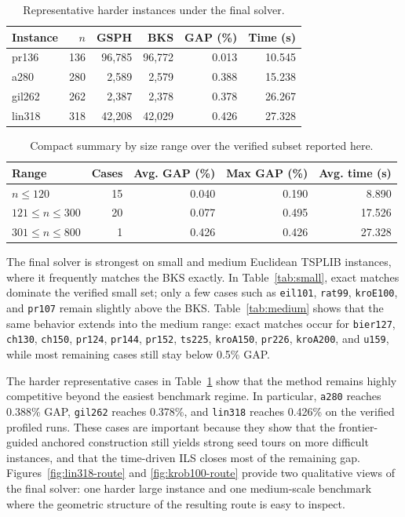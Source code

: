 \documentclass[runningheads]{llncs}
\begin{document}
\begin{table}
\caption{Representative harder instances under the final solver.}
\label{tab:hard}
\centering\small
\begin{tabular}{@{}lrrrrr@{}}
\toprule
\textbf{Instance} & $n$ & \textbf{GSPH} & \textbf{BKS} & \textbf{GAP (\%)} & \textbf{Time (s)}\\
\midrule
pr136   & 136 &  96{,}785 &  96{,}772 & 0.013 & 10.545 \\
 a280    & 280 &   2{,}589 &   2{,}579 & 0.388 & 15.238 \\
 gil262  & 262 &   2{,}387 &   2{,}378 & 0.378 & 26.267 \\
 lin318  & 318 &  42{,}208 &  42{,}029 & 0.426 & 27.328 \\
\bottomrule
\end{tabular}
\end{table}

\begin{table}
\caption{Compact summary by size range over the verified subset reported here.}
\label{tab:summary}
\centering\small
\begin{tabular}{@{}lrrrr@{}}
\toprule
\textbf{Range} & \textbf{Cases} & \textbf{Avg. GAP (\%)} & \textbf{Max GAP (\%)} & \textbf{Avg. time (s)}\\
\midrule
$n\le 120$        & 15 & 0.040 & 0.190 & 8.890 \\
$121\le n\le 300$ & 20 & 0.077 & 0.495 & 17.526 \\
$301\le n\le 800$ &  1 & 0.426 & 0.426 & 27.328 \\
\bottomrule
\end{tabular}
\end{table}

The final solver is strongest on small and medium Euclidean TSPLIB
instances, where it frequently matches the BKS exactly. In
Table~\ref{tab:small}, exact matches dominate the verified small set;
only a few cases such as \texttt{eil101}, \texttt{rat99},
\texttt{kroE100}, and \texttt{pr107} remain slightly above the BKS.
Table~\ref{tab:medium} shows that the same behavior extends into the
medium range: exact matches occur for \texttt{bier127}, \texttt{ch130},
\texttt{ch150}, \texttt{pr124}, \texttt{pr144}, \texttt{pr152},
\texttt{ts225}, \texttt{kroA150}, \texttt{pr226}, \texttt{kroA200}, and
\texttt{u159}, while most remaining cases still stay below 0.5\% GAP.

The harder representative cases in Table~\ref{tab:hard} show that the
method remains highly competitive beyond the easiest benchmark regime.
In particular, \texttt{a280} reaches 0.388\% GAP, \texttt{gil262}
reaches 0.378\%, and \texttt{lin318} reaches 0.426\% on the verified
profiled runs. These cases are important because they show that the
frontier-guided anchored construction still yields strong seed tours on
more difficult instances, and that the time-driven ILS closes most of
the remaining gap. Figures~\ref{fig:lin318-route} and
\ref{fig:krob100-route} provide two qualitative views of the final
solver: one harder large instance and one medium-scale benchmark where
the geometric structure of the resulting route is easy to inspect.
\end{document}
